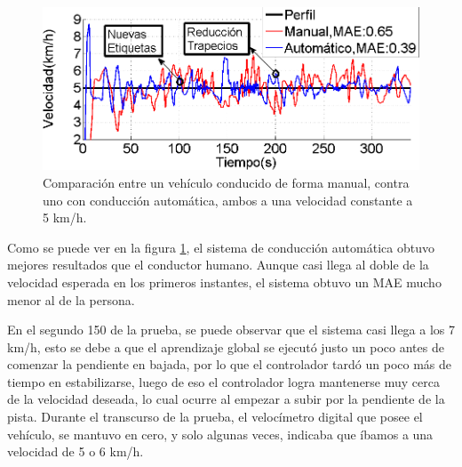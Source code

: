 \begin{figure}[htb]
\centering
\includegraphics[width=0.6\linewidth]{figures/AutoVsManual.png}
\caption{Comparación entre un vehículo conducido de forma manual, contra uno con conducción automática, ambos a una velocidad constante a 5 km/h.}
\label{fig:autoVsmanual}
\end{figure}

Como se puede ver en la figura \ref{fig:autoVsmanual}, el sistema de conducción automática obtuvo mejores resultados que el conductor humano. Aunque casi llega al doble de la velocidad esperada en los primeros instantes, el sistema obtuvo un \gls{MAE} mucho menor al de la persona.

En el segundo 150 de la prueba, se puede observar que el sistema casi llega a los 7 km/h, esto se debe a que el aprendizaje global se ejecutó justo un poco antes de comenzar la pendiente en bajada, por lo que el controlador tardó un poco más de tiempo en estabilizarse, luego de eso el controlador logra mantenerse muy cerca de la velocidad deseada, lo cual ocurre al empezar a subir por la pendiente de la pista. Durante el transcurso de la prueba, el velocímetro digital que posee el vehículo, se mantuvo en cero, y solo algunas veces, indicaba que íbamos a una velocidad de 5 o 6 km/h.   